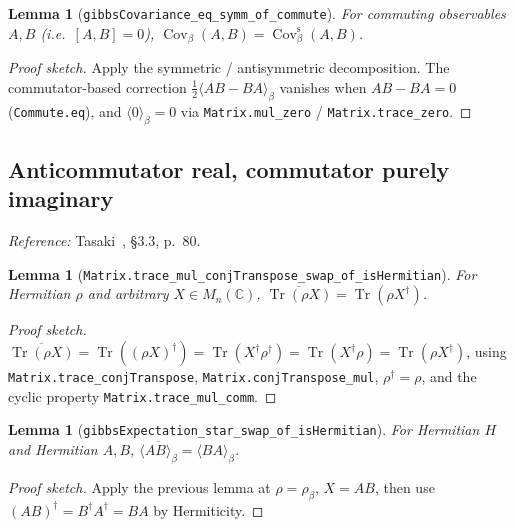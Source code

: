 \documentclass[a4paper,11pt]{article}
\newtheorem{lemma}[theorem]{Lemma}
\begin{document}
\begin{lemma}[\texttt{gibbsCovariance\_eq\_symm\_of\_commute}]
For commuting observables $A, B$ (i.e.\ $[A, B] = 0$),
$\operatorname{Cov}_\beta(A, B) = \operatorname{Cov}^{\mathrm{s}}_\beta(A, B)$.
\end{lemma}

\begin{proof}[Proof sketch]
Apply the symmetric / antisymmetric decomposition.  The
commutator-based correction
$\tfrac{1}{2} \langle A B - B A \rangle_\beta$ vanishes when
$A B - B A = 0$ (\texttt{Commute.eq}), and
$\langle 0 \rangle_\beta = 0$ via
\texttt{Matrix.mul\_zero} / \texttt{Matrix.trace\_zero}.
\end{proof}

\subsection{Anticommutator real, commutator purely imaginary}
\label{subsec:gibbs-anti-comm}

\emph{Reference:} Tasaki~\cite{Tasaki:QMB}, §3.3, p.~80.

\begin{lemma}[\texttt{Matrix.trace\_mul\_conjTranspose\_swap\_of\_isHermitian}]
For Hermitian $\rho$ and arbitrary $X \in M_n(\mathbb{C})$,
$\overline{\operatorname{Tr}(\rho X)} = \operatorname{Tr}(\rho X^\dagger)$.
\end{lemma}

\begin{proof}[Proof sketch]
$\overline{\operatorname{Tr}(\rho X)}
 = \operatorname{Tr}((\rho X)^\dagger)
 = \operatorname{Tr}(X^\dagger \rho^\dagger)
 = \operatorname{Tr}(X^\dagger \rho)
 = \operatorname{Tr}(\rho X^\dagger)$,
using \texttt{Matrix.trace\_conjTranspose},
\texttt{Matrix.conjTranspose\_mul}, $\rho^\dagger = \rho$, and the
cyclic property \texttt{Matrix.trace\_mul\_comm}.
\end{proof}

\begin{lemma}[\texttt{gibbsExpectation\_star\_swap\_of\_isHermitian}]
For Hermitian $H$ and Hermitian $A, B$,
$\overline{\langle A B \rangle_\beta} = \langle B A \rangle_\beta$.
\end{lemma}

\begin{proof}[Proof sketch]
Apply the previous lemma at $\rho = \rho_\beta$, $X = A B$, then use
$(A B)^\dagger = B^\dagger A^\dagger = B A$ by Hermiticity.
\end{proof}
\end{document}
